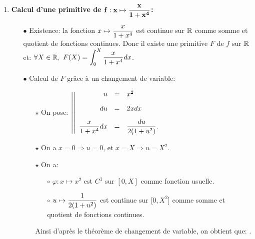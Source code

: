 \documentclass[a4paper, 11pt,reqno]{article}
\begin{document}

\begin{correction}  \;
	\begin{enumerate}
		\item \textbf{Calcul d'une primitive de $\mathbf{f: x\mapsto \displaystyle\frac{x}{1+x^4}}$:}
		      \begin{itemize}
			      \item[$\bullet$] Existence: la fonction $x\mapsto \displaystyle\frac{x}{1+x^4}$ est continue sur $\mathbb{R}$ comme somme et quotient de fonctions continues. Donc il existe une primitive $F$ de $f$ sur $\mathbb{R}$ et: $\forall X\in\mathbb{R},\ \displaystyle F(X)=\int_0^X \displaystyle \frac{x}{1+x^4}dx$.
			      \item[$\bullet$] Calcul de $F$ gr\^{a}ce \`{a} un changement de variable:
			            \begin{itemize}
				            \item[$\star$] On pose: $\left| \left|\begin{array}{rll}
						                  u                      & = & x^2\vsec                 \\
						                  du                     & = & 2xdx \vsec               \\
						                  \ddp\frac{x}{1+x^4} dx & = & \ddp\frac{du}{2(1+u^2)}.
					                  \end{array}\right.\right.$
				            \item[$\star$] On a $x=0 \Rightarrow u=0$, et $x=X \Rightarrow u= X^2$.
				            \item[$\star$] On a:
				                  \begin{itemize}
					                  \item[$\circ$] $\varphi: x\mapsto x^2$ est $C^1$ sur $\left\lbrack 0,X \right\rbrack$ comme fonction usuelle.
					                  \item[$\circ$] $u\mapsto   \displaystyle\frac{1}{2(1+u^2)} $ est continue sur $\lbrack 0,X^2\rbrack$ comme somme et quotient de fonctions continues.
				                  \end{itemize}
				                  Ainsi d'apr\`{e}s le th\'eor\`{e}me de changement de variable, on obtient que:
				                  .
			            \end{itemize}
		      \end{itemize}

\end{enumerate}
\end{correction}
\end{document}
